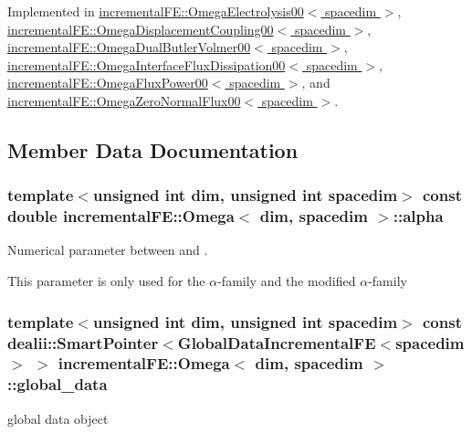 Implemented in \hyperlink{classincremental_f_e_1_1_omega_electrolysis00_ac2bf76c266936461a5b8cfb7a60624da}{incremental\+F\+E\+::\+Omega\+Electrolysis00$<$ spacedim $>$}, \hyperlink{classincremental_f_e_1_1_omega_displacement_coupling00_add2792deb962c321509264fce6fbdec5}{incremental\+F\+E\+::\+Omega\+Displacement\+Coupling00$<$ spacedim $>$}, \hyperlink{classincremental_f_e_1_1_omega_dual_butler_volmer00_ac3678f68c26fd880c2bd11fc357bc342}{incremental\+F\+E\+::\+Omega\+Dual\+Butler\+Volmer00$<$ spacedim $>$}, \hyperlink{classincremental_f_e_1_1_omega_interface_flux_dissipation00_a1d609a41db2f3231ad2f2d05aeea5441}{incremental\+F\+E\+::\+Omega\+Interface\+Flux\+Dissipation00$<$ spacedim $>$}, \hyperlink{classincremental_f_e_1_1_omega_flux_power00_abbcdc6c23167a34199401338b7fe058f}{incremental\+F\+E\+::\+Omega\+Flux\+Power00$<$ spacedim $>$}, and \hyperlink{classincremental_f_e_1_1_omega_zero_normal_flux00_a5e3158d47ccf7f0bf53dda6a93d27c57}{incremental\+F\+E\+::\+Omega\+Zero\+Normal\+Flux00$<$ spacedim $>$}.



\subsection{Member Data Documentation}
\subsubsection[{\texorpdfstring{alpha}{alpha}}]{\setlength{\rightskip}{0pt plus 5cm}template$<$unsigned int dim, unsigned int spacedim$>$ const double {\bf incremental\+F\+E\+::\+Omega}$<$ dim, spacedim $>$\+::alpha\hspace{0.3cm}{\ttfamily [private]}}\hypertarget{classincremental_f_e_1_1_omega_a891688560ec0ad8dc5a0058a7b400269}{}\label{classincremental_f_e_1_1_omega_a891688560ec0ad8dc5a0058a7b400269}
Numerical parameter between {} and {}.

This parameter is only used for the $\alpha$-\/family and the modified $\alpha$-\/family 
\subsubsection[{\texorpdfstring{global\+\_\+data}{global_data}}]{\setlength{\rightskip}{0pt plus 5cm}template$<$unsigned int dim, unsigned int spacedim$>$ const dealii\+::\+Smart\+Pointer$<${\bf Global\+Data\+Incremental\+FE}$<$spacedim$>$ $>$ {\bf incremental\+F\+E\+::\+Omega}$<$ dim, spacedim $>$\+::global\+\_\+data\hspace{0.3cm}{\ttfamily [private]}}\hypertarget{classincremental_f_e_1_1_omega_abd23d288a7a4a43f9b528be968cd2113}{}\label{classincremental_f_e_1_1_omega_abd23d288a7a4a43f9b528be968cd2113}
global data object 
